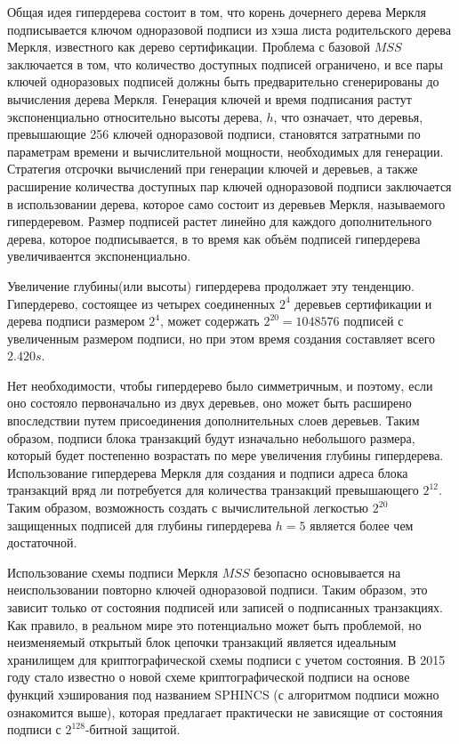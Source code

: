 \documentclass[a4paper, 14pt]{extarticle}
\begin{document}
Общая идея гипердерева состоит в том, что корень дочернего дерева Меркля подписывается ключом одноразовой подписи из хэша листа родительского дерева Меркля, известного как дерево сертификации. Проблема с базовой $MSS$ заключается в том, что количество доступных подписей ограничено, и все пары ключей одноразовых подписей должны быть предварительно сгенерированы до вычисления дерева Меркля. Генерация ключей и время подписания растут экспоненциально относительно высоты дерева, $h$, что означает, что деревья, превышающие 256 ключей одноразовой подписи, становятся затратными по параметрам времени и вычислительной мощности, необходимых для генерации. Стратегия отсрочки вычислений при генерации ключей и деревьев, а также расширение количества доступных пар ключей одноразовой подписи заключается в использовании дерева, которое само состоит из деревьев Меркля, называемого гипердеревом. Размер подписей растет линейно для каждого дополнительного дерева, которое подписывается, в то время как объём подписей гипердерева увеличиваентся экспоненциально.

Увеличение глубины(или высоты) гипердерева продолжает эту тенденцию. Гипердерево, состоящее из четырех соединенных $2^4$ деревьев сертификации и дерева подписи размером $2^4$, может содержать $2^{20} = 1 048 576$ подписей с увеличенным размером подписи, но при этом время создания составляет всего $2.420s$.

Нет необходимости, чтобы гипердерево было симметричным, и поэтому, если оно состояло первоначально из двух деревьев, оно может быть расширено впоследствии путем присоединения дополнительных слоев деревьев. Таким образом, подписи блока транзакций будут изначально небольшого размера, который будет постепенно возрастать по мере увеличения глубины гипердерева. Использование гипердерева Меркля для создания и подписи адреса блока транзакций вряд ли потребуется для количества транзакций превышающего $2^{12}$. Таким образом, возможность создать с вычислительной легкостью $2^{20}$ защищенных подписей для глубины гипердерева $h = 5$ является более чем достаточной.

Использование схемы подписи Меркля $MSS$ безопасно основывается на неиспользовании повторно ключей одноразовой подписи. Таким образом, это зависит только от состояния подписей или записей о подписанных транзакциях. Как правило, в реальном мире это потенциально может быть проблемой, но неизменяемый открытый блок цепочки транзакций является идеальным хранилищем для криптографической схемы подписи с учетом состояния. В 2015 году стало известно о новой схеме криптографической подписи на основе функций хэширования под названием SPHINCS (с алгоритмом подписи можно ознакомится выше), которая предлагает практически не зависящие от состояния подписи с $2^{128}$-битной защитой.
\end{document}
